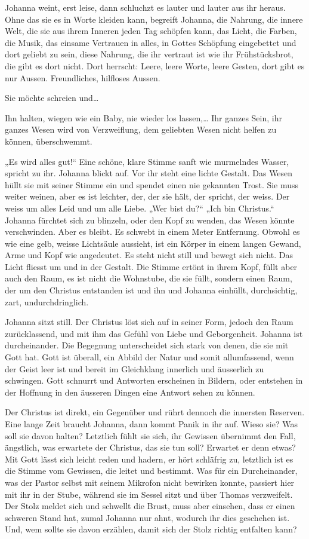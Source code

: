\documentclass[10pt,titlepage,a5paper]{book}
\begin{document}
Johanna weint, erst leise, dann schluchzt es lauter und lauter aus ihr heraus. Ohne das sie es in Worte kleiden kann, begreift Johanna, die Nahrung, die innere Welt, die sie aus ihrem Inneren jeden Tag schöpfen kann, das Licht, die Farben, die Musik, das einsame Vertrauen in alles, in Gottes Schöpfung eingebettet und dort geliebt zu sein, diese Nahrung, die ihr vertraut ist wie ihr Frühstücksbrot, die gibt es dort nicht. Dort herrscht: Leere, leere Worte, leere Gesten, dort gibt es nur Aussen. Freundliches, hilfloses Aussen.

Sie möchte schreien und\dots 

Ihn halten, wiegen wie ein Baby, nie wieder los lassen,\dots 
Ihr ganzes Sein, ihr ganzes Wesen wird von Verzweiflung, dem geliebten Wesen nicht helfen zu können, überschwemmt.

„Es wird alles gut!“ Eine schöne, klare Stimme sanft wie murmelndes Wasser, spricht zu ihr. Johanna blickt auf. Vor ihr steht eine lichte Gestalt. Das Wesen hüllt sie mit seiner Stimme ein und spendet einen nie gekannten Trost. Sie muss weiter weinen, aber es ist leichter, der, der sie hält, der spricht, der weiss. Der weiss um alles Leid und um alle Liebe. „Wer bist du?“ „Ich bin Christus.“ Johanna fürchtet sich zu blinzeln, oder den Kopf zu wenden, das Wesen könnte verschwinden. Aber es bleibt. Es schwebt in einem Meter Entfernung. Obwohl es wie eine gelb, weisse Lichtsäule aussieht, ist ein Körper in einem langen Gewand, Arme und Kopf wie angedeutet.  Es steht nicht still und bewegt sich nicht. Das Licht fliesst um und in der Gestalt. Die Stimme ertönt in ihrem Kopf, füllt aber auch den Raum, es ist nicht die Wohnstube, die sie füllt, sondern einen Raum, der um den Christus entstanden ist und ihn und Johanna einhüllt, durchsichtig, zart, undurchdringlich.

Johanna sitzt still. Der Christus löst sich auf in seiner Form, jedoch den Raum zurücklassend, und mit ihm das Gefühl von Liebe und Geborgenheit. 
Johanna ist durcheinander. Die Begegnung unterscheidet sich stark von denen, die sie mit Gott hat. Gott ist überall, ein Abbild der Natur und somit allumfassend, wenn der Geist leer ist und bereit im Gleichklang innerlich und äusserlich zu schwingen. Gott schnurrt und Antworten erscheinen in Bildern, oder entstehen in der Hoffnung in den äusseren Dingen eine Antwort sehen zu können.

Der Christus ist direkt, ein Gegenüber und rührt dennoch die innersten Reserven. Eine lange Zeit braucht Johanna, dann kommt Panik in ihr auf. Wieso sie? Was soll sie davon halten? Letztlich fühlt sie sich, ihr Gewissen übernimmt den Fall, ängstlich, was erwartete der Christus, das sie tun soll? Erwartet er denn etwas? Mit Gott lässt sich leicht reden und hadern, er hört schläfrig zu, letztlich ist es die Stimme vom Gewissen, die leitet und bestimmt. Was für ein Durcheinander, was der Pastor selbst mit seinem Mikrofon nicht bewirken konnte, passiert hier mit ihr in der Stube, während sie im Sessel sitzt und über Thomas verzweifelt. Der Stolz meldet sich und schwellt die Brust, muss aber einsehen, dass er einen schweren Stand hat, zumal Johanna nur ahnt, wodurch ihr dies geschehen ist. Und, wem sollte sie davon erzählen, damit sich der Stolz richtig entfalten kann?
\end{document}

